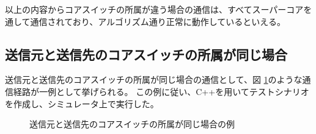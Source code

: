 以上の内容からコアスイッチの所属が違う場合の通信は、すべてスーパーコアを通して通信されており、アルゴリズム通り正常に動作しているといえる。

\subsection{送信元と送信先のコアスイッチの所属が同じ場合}

送信元と送信先のコアスイッチの所属が同じ場合の通信として、図 \ref{fig:4-4}のような通信経路が一例として挙げられる。
この例に従い、C++を用いてテストシナリオを作成し、シミュレータ上で実行した。

\begin{figure}[tb]
	\begin{center}
		\caption{送信元と送信先のコアスイッチの所属が同じ場合の例}
		\label{fig:4-4}
	\end{center}
\end{figure}

